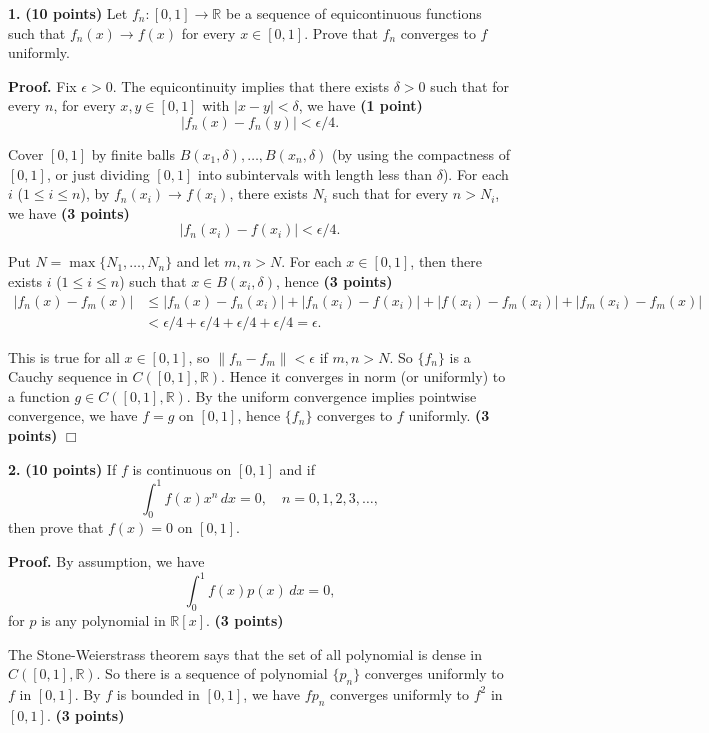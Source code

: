 \documentclass{article}
\begin{document}
    
    
    
    
    

    
    \textbf{1.} \textbf{(10 points)} Let $f_n: [0,1] \to \mathbb{R}$ be a
sequence of equicontinuous functions such that $f_n(x) \to f(x)$ for
every $x\in [0,1]$. Prove that $f_n$ converges to $f$ uniformly.

    \textbf{Proof.} Fix $\epsilon > 0$. The equicontinuity implies that
there exists $\delta > 0$ such that for every $n$, for every
$x,y\in [0,1]$ with $|x-y|<\delta$, we have \textbf{(1 point)}
\[|f_n (x) - f_n(y)| < \epsilon /4.\]

Cover $[0,1]$ by finite balls $B(x_1,\delta),\ldots,B(x_n,\delta)$ (by
using the compactness of $[0,1]$, or just dividing $[0,1]$ into
subintervals with length less than $\delta$). For each $i$
($1\le i \le n$), by $f_n(x_i) \to f(x_i)$, there exists $N_i$ such that
for every $n>N_i$, we have \textbf{(3 points)}
\[|f_n(x_i) - f(x_i)| < \epsilon / 4.\]

Put $N = \max\{N_1,\ldots,N_n\}$ and let $m,n > N$. For each
$x \in [0,1]$, then there exists $i$ ($1\le i \le n$) such that
$x \in B(x_i,\delta)$, hence \textbf{(3 points)} \[\begin{aligned}
|f_n(x) - f_m(x)| &\le |f_n(x) - f_n(x_i)| + |f_n(x_i) - f(x_i)| + |f(x_i) - f_m(x_i)| + |f_m(x_i) - f_m(x)| \\
& <  \epsilon /4 + \epsilon /4 + \epsilon /4 + \epsilon/4 = \epsilon.
\end{aligned}\]

This is true for all $x\in [0,1]$, so $\|f_n - f_m\| < \epsilon$ if
$m,n > N$. So $\{f_n\}$ is a Cauchy sequence in $C([0,1],\mathbb{R})$.
Hence it converges in norm (or uniformly) to a function
$g \in C([0,1],\mathbb{R})$. By the uniform convergence implies
pointwise convergence, we have $f = g$ on $[0,1]$, hence $\{f_n\}$
converges to $f$ uniformly. \textbf{(3 points)} $\Box$

    \textbf{2.} \textbf{(10 points)} If $f$ is continuous on $[0,1]$ and if
\[\int_0^1 f(x) x^n\,dx = 0, \quad n = 0,1,2,3,\ldots,\] then prove that
$f(x) = 0$ on $[0,1]$.

    \textbf{Proof.} By assumption, we have
\[\tag{*} \int_0^1 f(x) p(x) \,dx = 0,\] for $p$ is any polynomial in
$\mathbb{R}[x]$. \textbf{(3 points)}

The Stone-Weierstrass theorem says that the set of all polynomial is
dense in $C([0,1],\mathbb{R})$. So there is a sequence of polynomial
$\{p_n\}$ converges uniformly to $f$ in $[0,1]$. By $f$ is bounded in
$[0,1]$, we have $fp_n$ converges uniformly to $f^2$ in $[0,1]$.
\textbf{(3 points)}
\end{document}
